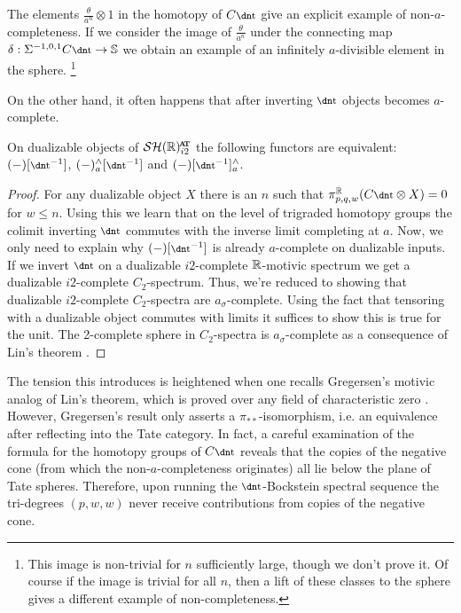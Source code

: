 \begin{exm}
  The elements $\frac{\theta}{a^n} \otimes 1$ in the homotopy of $C\ta$ give an explicit example of non-$a$-completeness.
  If we consider the image of $\frac{\theta}{a^n}$ under the connecting map $\delta: \Sigma^{-1,0,1}C\ta \to \Ss$ we obtain an example of an infinitely $a$-divisible element in the sphere. \footnote{This image is non-trivial for $n$ sufficiently large, though we don't prove it. Of course if the image is trivial for all $n$, then a lift of these classes to the sphere gives a different example of non-completeness.}    
\end{exm}

On the other hand,
it often happens that after inverting $\ta$ objects becomes $a$-complete.

\begin{lem}\label{lem:using-lin}
  On dualizable objects of $\SHRat$ the following functors are equivalent:
  $(-)[\ta^{-1}]$, $(-)_a^\wedge[\ta^{-1}]$ and $(-)[\ta^{-1}]_a^\wedge$.
\end{lem}

\begin{proof}
  For any dualizable object $X$ there is an $n$ such that $\pi_{p,q,w} ^\R (C\ta \otimes X) = 0$ for $w \leq n$. Using this we learn that on the level of trigraded homotopy groups the colimit inverting $\ta$ commutes with the inverse limit completing at $a$. Now, we only need to explain why $(-)[\ta^{-1}]$ is already $a$-complete on dualizable inputs. If we invert $\ta$ on a dualizable $i2$-complete $\mathbb{R}$-motivic spectrum we get a dualizable $i2$-complete $C_2$-spectrum. Thus, we're reduced to showing that dualizable $i2$-complete $C_2$-spectra are $a_\sigma$-complete. Using the fact that tensoring with a dualizable object commutes with limits it suffices to show this is true for the unit. The 2-complete sphere in $C_2$-spectra is $a_\sigma$-complete as a consequence of Lin's theorem \cite{Lin}.
\end{proof}

The tension this introduces is heightened when one recalls Gregersen's motivic analog of Lin's theorem, which is proved over any field of characteristic zero \cite{gregersen}. However, Gregersen's result only asserts a $\pi_{**}$-isomorphism, i.e. an equivalence after reflecting into the Tate category. 
In fact, a careful examination of the formula for the homotopy groups of $C\ta$ reveals that the copies of the negative cone (from which the non-$a$-completeness originates) all lie below the plane of Tate spheres. Therefore, upon running the $\ta$-Bockstein spectral sequence the tri-degrees $(p,w,w)$ never receive contributions from copies of the negative cone. 

